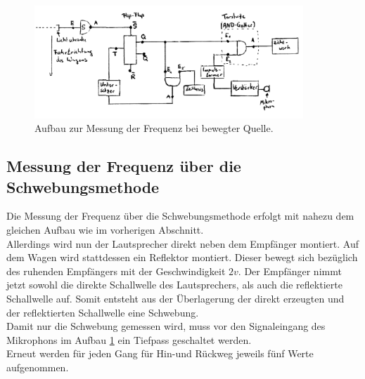 \begin{figure}
	\centering
	\includegraphics[width=0.9\textwidth]{Bilder/frequenzmessung_schaltung.png}
	\caption{Aufbau zur Messung der Frequenz bei bewegter Quelle.}
	\label{fig:delphin}
\end{figure}

\FloatBarrier
\subsection{Messung der Frequenz über die Schwebungsmethode}
Die Messung der Frequenz über die Schwebungsmethode erfolgt mit nahezu dem gleichen Aufbau wie im vorherigen Abschnitt.\\
Allerdings wird nun der Lautsprecher direkt neben dem Empfänger montiert.
Auf dem Wagen wird stattdessen ein Reflektor montiert. Dieser bewegt sich bezüglich des ruhenden Empfängers mit der Geschwindigkeit $2v$.
Der Empfänger nimmt jetzt sowohl die direkte Schallwelle des Lautsprechers, als auch die reflektierte Schallwelle auf.
Somit entsteht aus der Überlagerung der direkt erzeugten und der reflektierten Schallwelle eine Schwebung.\\
Damit nur die Schwebung gemessen wird, muss vor den Signaleingang des Mikrophons im Aufbau \ref{fig:delphin} ein Tiefpass geschaltet werden.\\
Erneut werden für jeden Gang für Hin-und Rückweg jeweils fünf Werte aufgenommen.
